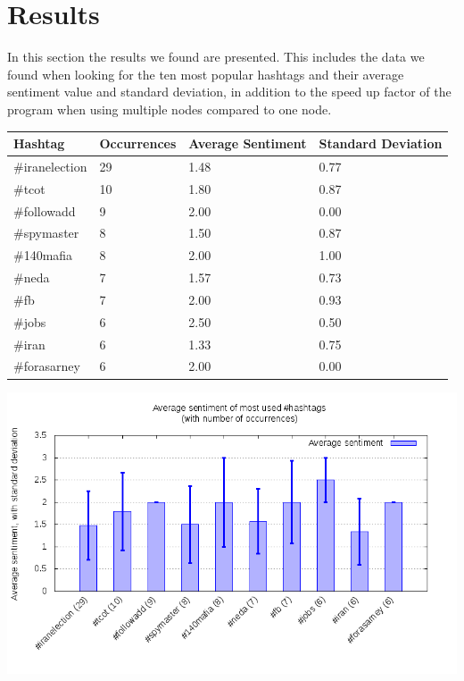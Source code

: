 \documentclass[a4paper,12px]{article}
\begin{document}
\section{Results}

In this section the results we found are presented. This includes the data we
found when looking for the ten most popular hashtags and their average sentiment
value and standard deviation, in addition to the speed up factor of the program
when using multiple nodes compared to one node. \\

\noindent\begin{tabularx}{\textwidth}{p{} p{} p{} p{}}
    Hashtag & Occurrences & Average Sentiment & Standard Deviation \\
    \hline
    \#iranelection  & 29 & 1.48 & 0.77 \\
    \#tcot          & 10 & 1.80 & 0.87 \\
    \#followadd     & 9  & 2.00 & 0.00 \\
    \#spymaster     & 8  & 1.50 & 0.87 \\
    \#140mafia      & 8  & 2.00 & 1.00 \\
    \#neda          & 7  & 1.57 & 0.73 \\
    \#fb            & 7  & 2.00 & 0.93 \\
    \#jobs          & 6  & 2.50 & 0.50 \\
    \#iran          & 6  & 1.33 & 0.75 \\
    \#forasarney    & 6  & 2.00 & 0.00 \\
\end{tabularx}

\begin{center}
    \includegraphics[width=\textwidth]{sentiment}
\end{center}
\end{document}
